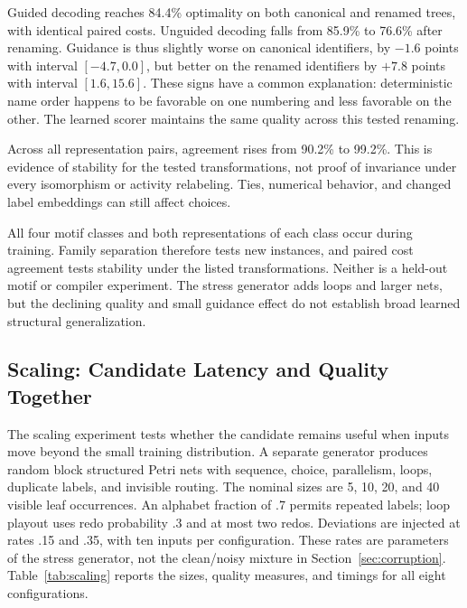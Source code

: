 Guided decoding reaches 84.4\% optimality on both canonical and renamed trees, with identical paired costs. Unguided decoding falls from 85.9\% to 76.6\% after renaming. Guidance is thus slightly worse on canonical identifiers, by $-1.6$ points with interval $[-4.7,0.0]$, but better on the renamed identifiers by $+7.8$ points with interval $[1.6,15.6]$. These signs have a common explanation: deterministic name order happens to be favorable on one numbering and less favorable on the other. The learned scorer maintains the same quality across this tested renaming.

Across all representation pairs, agreement rises from 90.2\% to 99.2\%. This is evidence of stability for the tested transformations, not proof of invariance under every isomorphism or activity relabeling. Ties, numerical behavior, and changed label embeddings can still affect choices. \begin{revised}All four motif classes and both representations of each class occur during training. Family separation therefore tests new instances, and paired cost agreement tests stability under the listed transformations. Neither is a held-out motif or compiler experiment. The stress generator adds loops and larger nets, but the declining quality and small guidance effect do not establish broad learned structural generalization.\end{revised}

\subsection{Scaling: Candidate Latency and Quality Together}
\label{sec:scaling}

The scaling experiment tests whether the candidate remains useful when inputs move beyond the small training distribution. A separate generator produces random block structured Petri nets with sequence, choice, parallelism, loops, duplicate labels, and invisible routing. The nominal sizes are 5, 10, 20, and 40 visible leaf occurrences. An alphabet fraction of .7 permits repeated labels; loop playout uses redo probability .3 and at most two redos. Deviations are injected at rates .15 and .35, with ten inputs per configuration. These rates are parameters of the stress generator, not the clean/noisy mixture in Section~\ref{sec:corruption}. Table~\ref{tab:scaling} reports the sizes, quality measures, and timings for all eight configurations.

